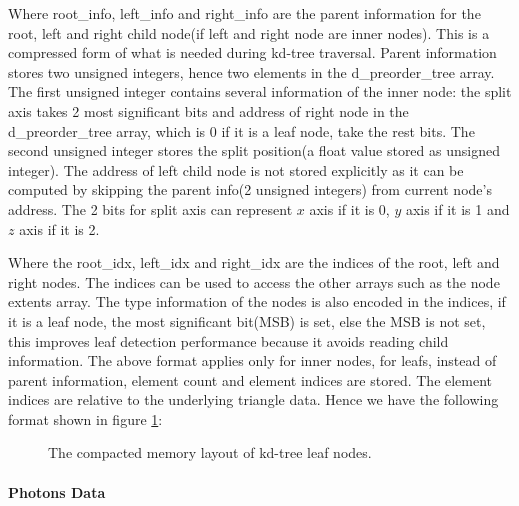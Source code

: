 Where root\_info, left\_info and right\_info are the parent information for the root, left and right child node(if left and right node are inner nodes). This is a compressed form of what is needed during kd-tree traversal. Parent information stores two unsigned integers, hence two elements in the d\_preorder\_tree array. The first unsigned integer contains several information of the inner node: the split axis takes 2 most significant bits and address of right node in the d\_preorder\_tree array, which is 0 if it is a leaf node, take the rest bits. The second unsigned integer stores the split position(a float value stored as unsigned integer). The address of left child node is not stored explicitly as it can be computed by skipping the parent info(2 unsigned integers) from current node's address. The 2 bits for split axis can represent \(x\) axis if it is 0, \(y\) axis if it is 1 and \(z\) axis if it is 2. 

Where the root\_idx, left\_idx and right\_idx are the indices of the root, left and right nodes. The indices can be used to access the other arrays such as the node extents array. The type information of the nodes is also encoded in the indices, if it is a leaf node, the most significant bit(MSB) is set, else the MSB is not set, this improves leaf detection performance because it avoids reading child information. The above format applies only for inner nodes, for leafs, instead of parent information, element count and element indices are stored. The element indices are relative to the underlying triangle data. Hence we have the following format shown in figure \ref{fig:kdtree_leaf_memory_layout}: 

\begin{figure}[htp] 
    \centering 
    \renewcommand{\thefigure}{\thechapter.\arabic{figure}}
    \caption[Compacted memory layout of kd-tree leaf nodes]{The compacted memory layout of kd-tree leaf nodes.} 
    \label{fig:kdtree_leaf_memory_layout} 
\end{figure}  

\paragraph{Photons Data} 

